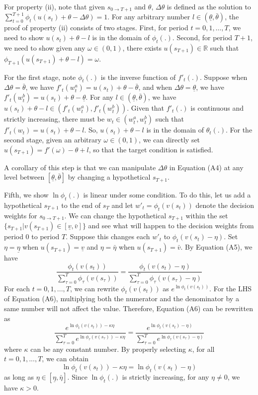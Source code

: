 \documentclass[
  12pt,
]{article}
\begin{document}
For property (ii), note that given \(s_{0\rightarrow T+1}\) and
\(\theta\), \(\Delta\theta\) is defined as the solution to
\(\sum_{t=0}^{T+1} \phi_t(u(s_t)+\theta-\Delta\theta)=1\). For any
arbitrary number \(l\in(\underline{\theta},\bar{\theta})\), the proof of
property (ii) consists of two stages. First, for period \(t=0,1,…,T\),
we need to show \(u(s_t)+\theta-l\) is in the domain of \(\phi_t(.)\).
Second, for period \(T+1\), we need to show given any
\(\omega\in(0,1)\), there exists \(u(s_{T+1})\in \mathbb{R}\) such that
\(\phi_{T+1}(u(s_{T+1})+\theta-l)=\omega\).

For the first stage, note \(\phi_t(.)\) is the inverse function of
\(f'_t(.)\). Suppose when \(\Delta\theta=\bar{\theta}\), we have
\(f'_t(w^{a}_t)=u(s_t)+\theta-\bar{\theta}\), and when
\(\Delta\theta=\underline{\theta}\), we have
\(f'_t(w^{b}_t)=u(s_t)+\theta-\underline{\theta}\). For any
\(l\in(\underline{\theta},\bar{\theta})\), we have
\(u(s_t)+\theta-l \in (f'_t(w^a_t),f'_t(w^b_t))\). Given that
\(f'_t(.)\) is continuous and strictly increasing, there must be
\(w_t\in(w^a_t,w^b_t)\) such that \(f'_t(w_t)=u(s_t)+\theta-l\). So,
\(u(s_t)+\theta-l\) is in the domain of \(\theta_t(.)\). For the second
stage, given an arbitrary \(\omega\in(0,1)\), we can directly set
\(u(s_{T+1})=f'(\omega)-\theta+l\), so that the target condition is
satisfied.

A corollary of this step is that we can manipulate \(\Delta \theta\) in
Equation (A4) at any level between \([\underline{\theta},\bar{\theta}]\)
by changing a hypothetical \(s_{T+1}\).

Fifth, we show \(\ln \phi_t(.)\) is linear under some condition. To do
this, let us add a hypothetical \(s_{T+1}\) to the end of \(s_T\) and
let \(w'_t=\phi_t(v(s_t))\) denote the decision weights for
\(s_{0\rightarrow T+1}\). We can change the hypothetical \(s_{T+1}\)
within the set \(\{s_{T+1}|v(s_{T+1})\in[\underline{v},\bar{v}]\}\) and
see what will happen to the decision weights from period 0 to period
\(T\). Suppose this changes each \(w'_t\) to \(\phi_t(v(s_t)-\eta)\).
Set \(\eta=\underline{\eta}\) when \(u(s_{T+1})=\underline{v}\) and
\(\eta=\bar{\eta}\) when \(u(s_{T+1})=\bar{v}\). By Equation (A5), we
have\[\tag{A6}
\frac{\phi_t(v(s_t))}{\sum_{\tau=0}^{T}\phi_\tau(v(s_\tau))} = \frac{\phi_t(v(s_t)-\eta)}{\sum_{\tau=0}^{T}\phi_\tau(v(s_\tau)-\eta)}
\]For each \(t=0,1,...,T\), we can rewrite \(\phi_t(v(s_t))\) as
\(e^{\ln \phi_t(v(s_t))}\). For the LHS of Equation (A6), multiplying
both the numerator and the denominator by a same number will not affect
the value. Therefore, Equation (A6) can be rewritten as \[
\frac{e^{\ln\phi_t(v(s_t))-\kappa\eta}}{\sum_{\tau=0}^{T}e^{\ln\phi_\tau(v(s_\tau))-\kappa\eta}} = \frac{e^{\ln\phi_t(v(s_t)-\eta)}}{\sum_{\tau=0}^{T}e^{\ln\phi_\tau(v(s_\tau)-\eta)}}
\]where \(\kappa\) can be any constant number. By properly selecting
\(\kappa\), for all \(t=0,1,...,T\), we can obtain\[\tag{A7}
\ln \phi_t(v(s_t))-\kappa\eta=\ln \phi_t(v(s_t)-\eta)
\]as long as \(\eta \in [\underline{\eta},\bar{\eta}]\). Since
\(\ln\phi_t(.)\) is strictly increasing, for any \(\eta\neq 0\), we have
\(\kappa>0\).
\end{document}
